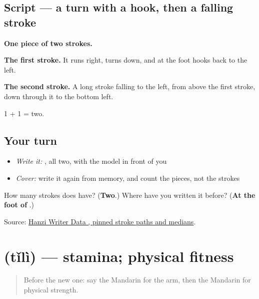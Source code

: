 \subsection*{Script — a turn with a hook, then a falling stroke}

\begin{quote}
\end{quote}

\textbf{One piece of two strokes.}

\textbf{The first stroke.} It runs right, turns down, and at the foot hooks back to the left.

\textbf{The second stroke.} A long stroke falling to the left, from above the first stroke, down through it to the bottom left.

1 + 1 = two.

\subsection*{Your turn}
\begin{itemize}
\raggedright
  \item \emph{Write it:} , all two, with the model in front of you
  \item \emph{Cover:} write it again from memory, and count the pieces, not the strokes
\end{itemize}

\begin{tcolorbox}[breakable,colback=teal!4,colframe=teal!35!black,title={Before you move on}]
How many strokes does  have? (\textbf{Two}.) Where have you written it before? (\textbf{At the foot of }.)

Source: \href{https://raw.githubusercontent.com/chanind/hanzi-writer-data/68d10a4b21150cae5e1ebbd223eed289cf32d90c/data/\%E5\%8A\%9B.json}{Hanzi Writer Data , pinned stroke paths and medians}.
\end{tcolorbox}
\section[\texorpdfstring{\zh{体力} (tǐlì)}{体力 (tǐlì)}]{ (tǐlì) — stamina; physical fitness}

\label{lesson:ZH-C474-tili}



\begin{quote}
Before the new one: say the Mandarin for the arm, then the Mandarin for physical strength.
\end{quote}

